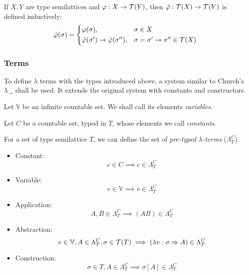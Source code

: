\documentclass[main.tex]{subfiles}
\begin{document}
\begin{defn}
    If $X, Y$ are type semilattices and $\varphi: X \rightarrow \mathcal{T}( Y )$,
    then $\hat{\varphi} : \mathcal{T}( X ) \rightarrow \mathcal{T}( Y )$ is defined inductively:
    \begin{equation*}
        \hat{\varphi}(\sigma) =
        \begin{cases*}
            \varphi(\sigma), & $\sigma \in X$ \\
            \hat{\varphi}(\sigma') \rightarrow \hat{\varphi}(\sigma''), &
                $\sigma = \sigma' \rightarrow \sigma'' \in \tclos{X}$ \\
        \end{cases*}
    \end{equation*}
\end{defn}

\subsubsection{Terms}
To define $\lambda$ terms with the types introduced above, a system similar
to Church's $\lambda_\rightarrow$ \cite[chap.~2.4]{ttfp} shall be used. It
extends the original system with constants and constructors.

\begin{defn}
    Let $\mathbb{V}$ be an infinite countable set. We shall call its elements
    \emph{variables}.
\end{defn}

\begin{defn}
    Let $C$ be a countable set, typed in $T$,
    whose elements we call \emph{constants}.

    For a set of type semilattice $T$, we can define the set of
    \emph{pre-typed $\lambda$-terms} ($\Lambda_T^C$).

    \begin{itemize}
        \item Constant:    \[ c \in C \implies c \in \Lambda_T^C \]
        \item Variable:    \[ v \in \mathbb{V} \implies v \in \Lambda_T^C \]
        \item Application: \[ A, B \in \Lambda_T^C \implies (AB) \in \Lambda_T^C \]
        \item Abstraction: \[ v \in \mathbb{V}, A \in \Lambda_T^C, \sigma \in \mathcal{T}( T )
                \implies (\lambda v : \sigma \Rightarrow A) \in \Lambda_T^C \]
        \item Construction: \[ \sigma \in T, A \in \Lambda_T^C
                \implies \sigma[A] \in \Lambda_T^C \]
    \end{itemize}
\end{defn}
\end{document}
